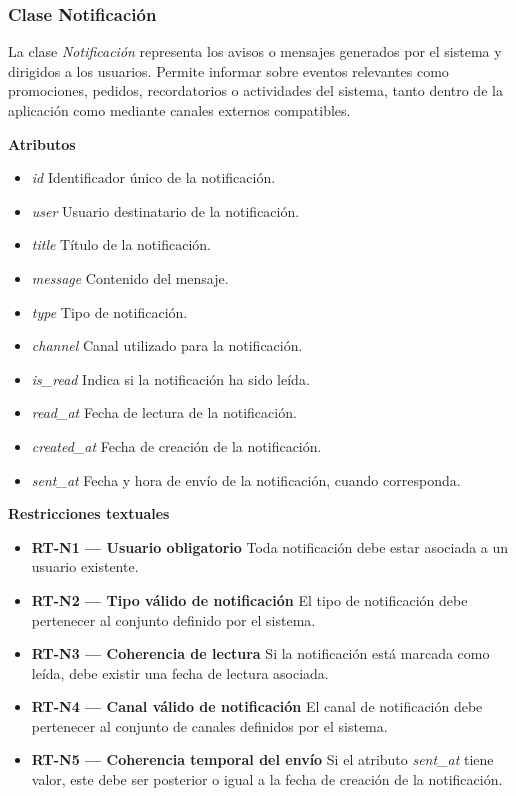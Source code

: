 \subsubsection{Clase Notificación}

La clase \textit{Notificación} representa los avisos o mensajes generados por el sistema y dirigidos a los usuarios. Permite informar sobre eventos relevantes como promociones, pedidos, recordatorios o actividades del sistema, tanto dentro de la aplicación como mediante canales externos compatibles.

\textbf{Atributos}

\begin{itemize}

      \item \textit{id}
            Identificador único de la notificación.
      \item \textit{user}
            Usuario destinatario de la notificación.
      \item \textit{title}
            Título de la notificación.
      \item \textit{message}
            Contenido del mensaje.
      \item \textit{type}
            Tipo de notificación.
      \item \textit{channel}
            Canal utilizado para la notificación.
      \item \textit{is\_read}
            Indica si la notificación ha sido leída.
      \item \textit{read\_at}
            Fecha de lectura de la notificación.
      \item \textit{created\_at}
            Fecha de creación de la notificación.
      \item \textit{sent\_at}
            Fecha y hora de envío de la notificación, cuando corresponda.

\end{itemize}

\textbf{Restricciones textuales}

\begin{itemize}

      \item \textbf{RT-N1 — Usuario obligatorio}
            Toda notificación debe estar asociada a un usuario existente.
      \item \textbf{RT-N2 — Tipo válido de notificación}
            El tipo de notificación debe pertenecer al conjunto definido por el sistema.
      \item \textbf{RT-N3 — Coherencia de lectura}
            Si la notificación está marcada como leída, debe existir una fecha de lectura asociada.
      \item \textbf{RT-N4 — Canal válido de notificación}
            El canal de notificación debe pertenecer al conjunto de canales definidos por el sistema.
      \item \textbf{RT-N5 — Coherencia temporal del envío}
            Si el atributo \textit{sent\_at} tiene valor, este debe ser posterior o igual a la fecha de creación de la notificación.

\end{itemize}

